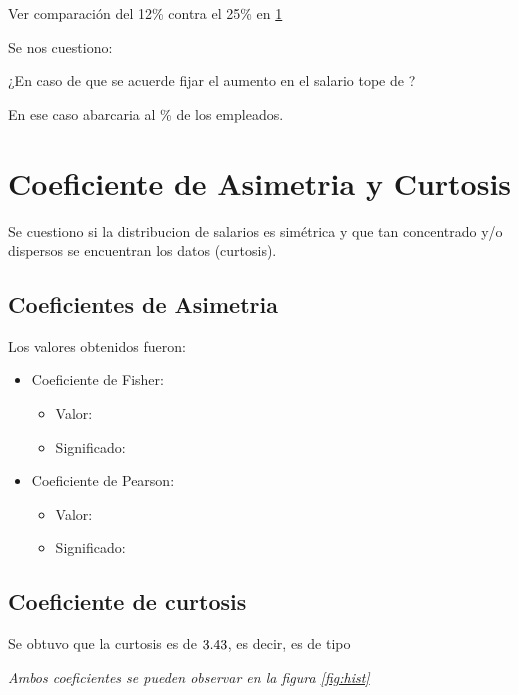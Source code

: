 \documentclass{article}
\begin{document}
Ver comparación del 12\% contra el 25\% en \ref{fig:aumentosalarial}

\begin{figure}[!ht]
    \label{fig:aumentosalarial}
    
\end{figure}

Se nos cuestiono:

¿En caso de que se acuerde fijar el aumento en el salario tope de ?

En ese caso abarcaria al \PorcentajeMenorAMil\% de los empleados.

\section{Coeficiente de Asimetria y Curtosis}


Se cuestiono si la distribucion de salarios es simétrica y que tan concentrado y/o dispersos se encuentran los datos (curtosis).

\subsection{Coeficientes de Asimetria}

Los valores obtenidos fueron:
\begin{itemize}
    \item Coeficiente de Fisher:
    \begin{itemize}
        \item Valor: \CoeficienteFisher
        \item Significado: \CoeficienteFisherTipo
    \end{itemize}
    \item Coeficiente de Pearson: 
    \begin{itemize}
        \item Valor: \CoeficientePearson
        \item Significado: \CoeficientePearsonTipo
    \end{itemize}
\end{itemize}

\subsection{Coeficiente de curtosis}

Se obtuvo que la curtosis es de \(3.43\), es decir, es de tipo \CoeficienteCurtosisTipo

\emph{Ambos coeficientes se pueden observar en la figura \ref{fig:hist}}
\end{document}
